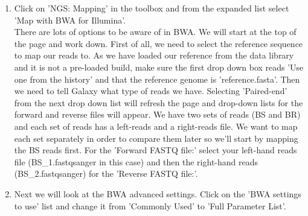 \documentclass[12pt,a4paper]{article}
\begin{document}
\begin{enumerate}
	\item Click on 'NGS: Mapping' in the toolbox and from the
          expanded list select 'Map with BWA for Illumina'.  \\

          There are lots of options to be aware of in BWA. We will
          start at the top of the page and work down. First of all, we
          need to select the reference sequence to map our reads
          to. As we have loaded our reference from the data library
          and it is not a pre-loaded build, make sure the first drop
          down box reads 'Use one from the history' and that the
          reference genome is 'reference.fasta'. Then
          we need to tell Galaxy what type of reads we have. Selecting
          'Paired-end' from the next drop down list will refresh the
          page and drop-down lists for the forward and reverse files
          will appear. We have two sets of reads (BS and BR) and each
          set of reads has a left-reads and a right-reads file. We
          want to map each set separately in order to compare them
          later so we'll start by mapping the BS reads first. For the
          'Forward FASTQ file:' select your left-hand reads file
          (BS\_1.fastqsanger in this case) and then the right-hand
          reads (BS\_2.fastqsanger) for the 'Reverse FASTQ file:'.

	\item Next we will look at the BWA advanced settings. Click on
          the 'BWA settings to use' list and change it from 'Commonly
          Used' to 'Full Parameter List'.


\end{enumerate}
\end{document}
